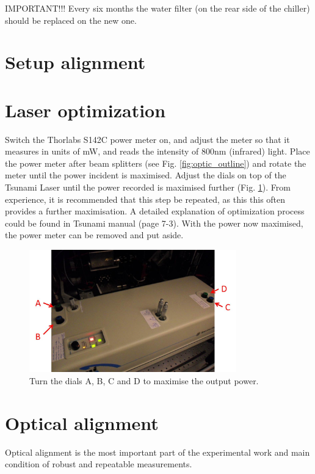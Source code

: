 \documentclass[14pt,a4paper] {article}
\begin{document}
IMPORTANT!!! Every six months the water filter (on the rear side of the chiller) should be replaced on the new one.




\section{Setup alignment}

\section{Laser optimization}
Switch the Thorlabs S142C power meter on, and adjust the meter so that it measures in units of mW, and reads the intensity of 800nm (infrared) light. Place the power meter after beam splitters (see Fig. \ref{fig:optic_outline}) and rotate the meter until the power incident is maximised. 
Adjust the dials on top of the Tsunami Laser until the power recorded is maximised further (Fig. \ref{fig:laser_walking}). From experience, it is recommended that this step be repeated, as this this often provides a further maximisation. A detailed explanation of optimization process could be found in Tsunami manual (page 7-3). With the power now maximised, the power meter can be removed and put aside.

\begin{figure}
\includegraphics[width=0.8\textwidth]{Tsunami-Laser-System.jpg}
\caption{Turn the dials A, B, C and D to maximise the output power.}
\label{fig:laser_walking}
\end{figure}

\newpage

\section{Optical alignment}
Optical alignment is the most important part of the experimental work and main condition of robust and repeatable measurements.
\end{document}
